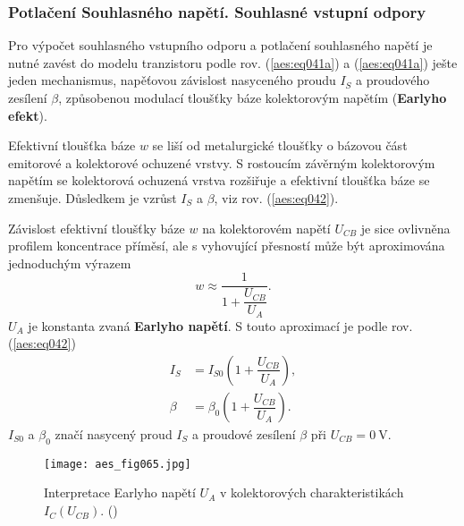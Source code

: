       \subsubsection{Potlačení Souhlasného napětí. Souhlasné vstupní
      odpory}\label{aesIchIIIsecIIIssecXII}
      
        Pro výpočet souhlasného vstupního odporu a potlačení souhlasného napětí je nutné zavést do
        modelu tranzistoru podle rov. (\ref{aes:eq041a}) a (\ref{aes:eq041a}) ješte jeden
        mechanismus, napěťovou závislost nasyceného proudu \(I_S\) a proudového zesílení \(\beta\),
        způsobenou modulací tloušťky báze kolektorovým napětím (\textbf{Earlyho efekt}).
        
        Efektivní tloušťka báze \(w\) se liší od metalurgické tloušťky o bázovou část emitorové a
        kolektorové ochuzené vrstvy. S rostoucím závěrným kolektorovým napětím se kolektorová
        ochuzená vrstva rozšiřuje a efektivní tloušťka báze se zmenšuje. Důsledkem je vzrůst \(I_S\)
        a \(\beta\), viz rov. (\ref{aes:eq042}).

        Závislost efektivní tloušťky báze \(w\) na kolektorovém napětí \(U_{CB}\) je sice ovlivněna
        profilem koncentrace příměsí, ale s vyhovující přesností může být aproximována jednoduchým
        výrazem
        \begin{equation}\label{aes:eq089}
          w \approx \dfrac{1}{1 + \dfrac{U_{CB}}{U_A}}.
        \end{equation}
        \(U_A\) je konstanta zvaná \textbf{Earlyho napětí}. S touto aproximací je podle rov.
        (\ref{aes:eq042})
        \begin{subequations}\label{aes:eq90}
          \begin{align}
            I_S   &= I_{S0}\left(1 + \dfrac{U_{CB}}{U_A}\right),           \label{aes:eq90a} \\
            \beta &= \beta_0\left(1 + \dfrac{U_{CB}}{U_A}\right).          \label{aes:eq90b} 
          \end{align}
        \end{subequations}
        \(I_{S0}\) a \(\beta_0\) značí nasycený proud \(I_S\) a proudové zesílení \(\beta\) při
        \(U_{CB} = \qty{0}{\V}\).

        \begin{figure}[ht!] %
          \centering
          \texttt{[image: aes\_fig065.jpg]}
          \caption{Interpretace Earlyho napětí \(U_A\) v kolektorových charakteristikách
                   \(I_C(U_{CB})\). (\cite[s.~54]{Dostal})}
          \label{aes:fig065}
        \end{figure}

